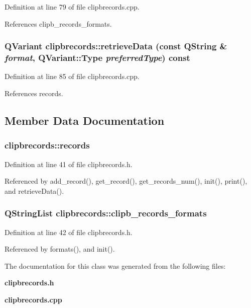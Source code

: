 Definition at line 79 of file clipbrecords.cpp.

References clipb\_\-records\_\-formats.
\subsubsection{\setlength{\rightskip}{0pt plus 5cm}QVariant clipbrecords::retrieve\-Data (const QString \& {\em format}, QVariant::Type {\em preferred\-Type}) const\hspace{0.3cm}{\tt  [protected]}}\label{classclipbrecords_230af274633fd96ac5d144811d4798e5}




Definition at line 85 of file clipbrecords.cpp.

References records.

\subsection{Member Data Documentation}
\subsubsection{ {\bf clipbrecords::records}\hspace{0.3cm}{\tt  [private]}}\label{classclipbrecords_99b923d31bf749f7714e138b0d6bfc4b}




Definition at line 41 of file clipbrecords.h.

Referenced by add\_\-record(), get\_\-record(), get\_\-records\_\-num(), init(), print(), and retrieve\-Data().
\subsubsection{\setlength{\rightskip}{0pt plus 5cm}QString\-List {\bf clipbrecords::clipb\_\-records\_\-formats}\hspace{0.3cm}{\tt  [private]}}\label{classclipbrecords_29f49b5fa69bd05e596a8909a03ab2d1}




Definition at line 42 of file clipbrecords.h.

Referenced by formats(), and init().

The documentation for this class was generated from the following files:\begin{CompactItemize}
\item 
{\bf clipbrecords.h}\item 
{\bf clipbrecords.cpp}\end{CompactItemize}
